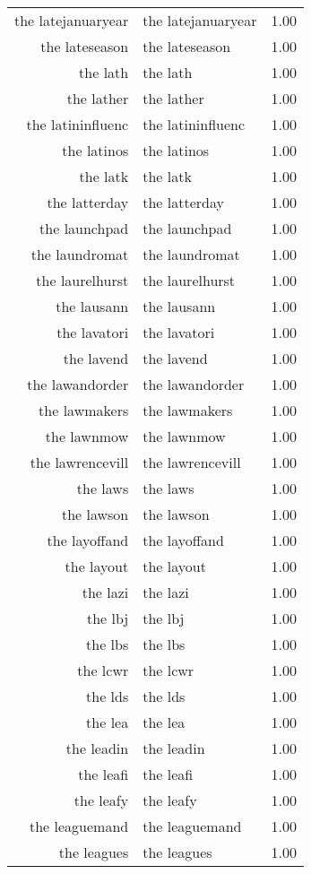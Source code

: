 \begin{table}[ht]
\begin{tabular}{rlr}
  the latejanuaryear & the latejanuaryear & 1.00 \\ 
  the lateseason & the lateseason & 1.00 \\ 
  the lath & the lath & 1.00 \\ 
  the lather & the lather & 1.00 \\ 
  the latininfluenc & the latininfluenc & 1.00 \\ 
  the latinos & the latinos & 1.00 \\ 
  the latk & the latk & 1.00 \\ 
  the latterday & the latterday & 1.00 \\ 
  the launchpad & the launchpad & 1.00 \\ 
  the laundromat & the laundromat & 1.00 \\ 
  the laurelhurst & the laurelhurst & 1.00 \\ 
  the lausann & the lausann & 1.00 \\ 
  the lavatori & the lavatori & 1.00 \\ 
  the lavend & the lavend & 1.00 \\ 
  the lawandorder & the lawandorder & 1.00 \\ 
  the lawmakers & the lawmakers & 1.00 \\ 
  the lawnmow & the lawnmow & 1.00 \\ 
  the lawrencevill & the lawrencevill & 1.00 \\ 
  the laws & the laws & 1.00 \\ 
  the lawson & the lawson & 1.00 \\ 
  the layoffand & the layoffand & 1.00 \\ 
  the layout & the layout & 1.00 \\ 
  the lazi & the lazi & 1.00 \\ 
  the lbj & the lbj & 1.00 \\ 
  the lbs & the lbs & 1.00 \\ 
  the lcwr & the lcwr & 1.00 \\ 
  the lds & the lds & 1.00 \\ 
  the lea & the lea & 1.00 \\ 
  the leadin & the leadin & 1.00 \\ 
  the leafi & the leafi & 1.00 \\ 
  the leafy & the leafy & 1.00 \\ 
  the leaguemand & the leaguemand & 1.00 \\ 
  the leagues & the leagues & 1.00 \\ 

\end{tabular}
\end{table}
